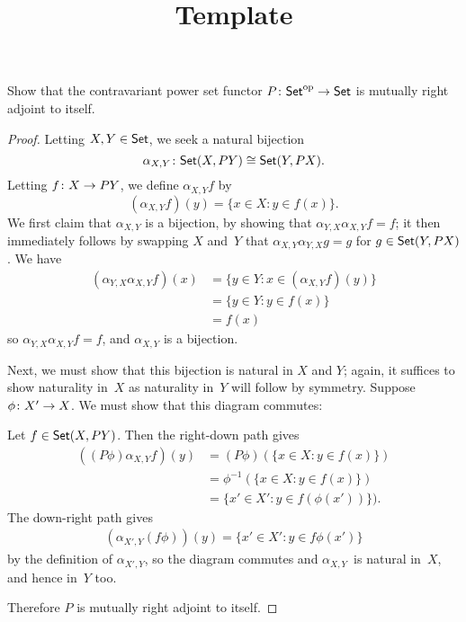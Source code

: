 \documentclass[../../solutions]{subfiles}
\title{Template}
\author{}
\begin{document}
\maketitle

%   

\begin{exercise}
  Show that the contravariant power set functor
  $\func{P}{\Set^\op}{\Set}$ is mutually right adjoint to itself.
\end{exercise}

\begin{proof}
  Letting $X,Y\in\mathsf{Set}$, we seek a natural bijection
  $$\isom{\alpha_{X,Y}}{\Set(X,PY)}{\Set(Y,PX)}.$$
  Letting ${f}\colon{X}\to{PY}$, we define $\alpha_{X,Y}f$ by
  $$(\alpha_{X,Y}f)(y)=\{x\in X:y\in f(x)\}.$$
  We first claim that $\alpha_{X,Y}$ is a bijection, by showing that
  $\alpha_{Y,X}\alpha_{X,Y}f=f$; it then immediately follows by
  swapping $X$ and~$Y$ that $\alpha_{X,Y}\alpha_{Y,X}g=g$ for
  $g\in\mathsf{Set}(Y,PX)$.  We have
  \begin{align*}
    (\alpha_{Y,X}\alpha_{X,Y}f)(x)
    &= \{y\in Y:x\in(\alpha_{X,Y}f)(y)\} \\
    &= \{y\in Y:y\in f(x)\} \\
    &= f(x)
  \end{align*}
  so $\alpha_{Y,X}\alpha_{X,Y}f=f$, and $\alpha_{X,Y}$ is a bijection.

  Next, we must show that this bijection is natural in $X$ and $Y$;
  again, it suffices to show naturality in~$X$ as naturality in~$Y$
  will follow by symmetry.  Suppose ${\phi}\colon{X'}\to{X}$.  We must
  show that this diagram commutes:
  \begin{center}
  \end{center}
  Let $f\in\mathsf{Set}(X,PY)$.  Then the right-down path gives
  \begin{align*}
    ((P\phi)\alpha_{X,Y}f)(y)
    &= (P\phi)(\{x\in X:y\in f(x)\}) \\
    &= \phi^{-1}(\{x\in X:y\in f(x)\}) \\
    &= \{x'\in X':y\in f(\phi(x'))\}).
  \end{align*}
  The down-right path gives
  \begin{align*}
    (\alpha_{X',Y}(f\phi))(y) = \{x'\in X':y\in f\phi(x')\}
  \end{align*}
  by the definition of $\alpha_{X',Y}$, so the diagram commutes and
  $\alpha_{X,Y}$~is natural in~$X$, and hence in~$Y$ too.

  Therefore $P$ is mutually right adjoint to itself.
\end{proof}
\end{document}
